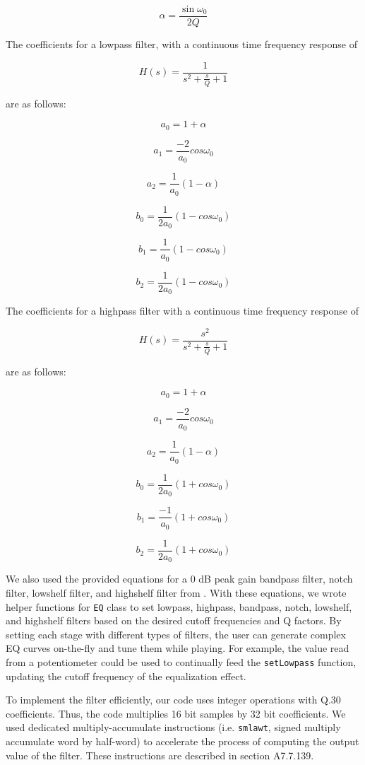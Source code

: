 \documentclass[conference]{IEEEtran}
\begin{document}
$$\alpha = \frac{\sin \omega_0}{2Q}$$


The coefficients for a lowpass filter, with a continuous time frequency response of

$$H(s) = \frac{1}{s^2 + \frac{s}{Q} + 1}$$

are as follows:

$$a_0 = 1 + \alpha$$

$$a_1 = \frac{-2}{a_0}  cos \omega_0$$

$$a_2 = \frac{1}{a_0}(1 - \alpha)$$

$$b_0 = \frac{1}{2a_0} (1 - cos \omega_0)$$

$$b_1 = \frac{1}{a_0} (1 - cos \omega_0)$$

$$b_2 = \frac{1}{2a_0} (1 - cos \omega_0)$$



The coefficients for a highpass filter with a continuous time frequency response of  

$$H(s) = \frac{s^2}{s^2 + \frac{s}{Q} + 1}$$

are as follows:

$$a_0 = 1 + \alpha$$

$$a_1 = \frac{-2}{a_0}  cos \omega_0$$

$$a_2 = \frac{1}{a_0}(1 - \alpha)$$

$$b_0 = \frac{1}{2a_0} (1 + cos \omega_0)$$

$$b_1 = \frac{-1}{a_0} (1 + cos \omega_0)$$

$$b_2 = \frac{1}{2a_0} (1 + cos \omega_0)$$

We also used the provided equations for a 0 dB peak gain bandpass filter, notch filter, lowshelf filter, and highshelf filter from \cite{eq_cookbook}. With these equations, we wrote helper functions for \texttt{EQ} class to set lowpass, highpass, bandpass, notch, lowshelf, and highshelf filters based on the desired cutoff frequencies and Q factors. By setting each stage with different types of filters, the user can generate complex EQ curves on-the-fly and tune them while playing. For example, the value read from a potentiometer could be used to continually feed the \texttt{setLowpass} function, updating the cutoff frequency of the equalization effect.

To implement the filter efficiently, our code uses integer operations with Q.30 coefficients. Thus, the code multiplies 16 bit samples by 32 bit coefficients. We used dedicated multiply-accumulate instructions (i.e. \texttt{smlawt}, signed multiply accumulate word by half-word) to accelerate the process of computing the output value of the filter. These instructions are described in \cite{arm_manual} section A7.7.139. 
\end{document}
